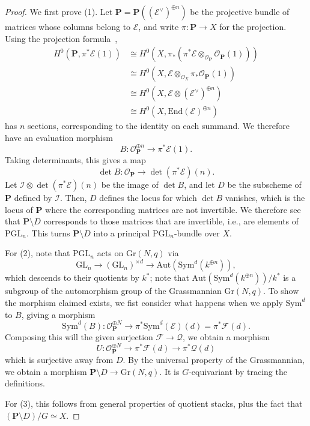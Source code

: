 \begin{proof}
We first prove (1).
Let $\mathbf{P} = \mathbf{P}((\mathcal{E}^\vee)^{\oplus n})$ be the projective
bundle of matrices whose columns belong to $\mathcal{E}$, and write
$\pi : \mathbf{P} \to X$ for the projection.
Using the projection formula~,
\begin{align*}
H^0(\mathbf{P}, \pi^*\mathcal{E}(1))
& \cong H^0(X, \pi_*(\pi^*\mathcal{E} \otimes_{\mathcal{O}_{\mathbf{P}}}
\mathcal{O}_{\mathbf{P}}(1)))\\
& \cong H^0(X,\mathcal{E} \otimes_{\mathcal{O}_X}
\pi_*\mathcal{O}_{\mathbf{P}}(1))\\
& \cong H^0(X,\mathcal{E} \otimes (\mathcal{E}^\vee)^{\oplus n})\\
& \cong H^0(X,\mathrm{End}(\mathcal{E})^{\oplus n})
\end{align*}
has $n$ sections, corresponding to the identity on each summand.
We therefore have an evaluation morphism
$$
B : \mathcal{O}_{\mathbf{P}}^{\oplus n} \longrightarrow \pi^*\mathcal{E}(1).
$$
Taking determinants, this gives a map
$$
\det B : \mathcal{O}_{\mathbf{P}} \longrightarrow \det(\pi^*\mathcal{E})(n).
$$
Let $\mathcal{I} \otimes \det(\pi^*\mathcal{E}) (n)$ be the image of $\det B$,
and let $D$ be the subscheme of $\mathbf{P}$ defined by $\mathcal{I}$.
Then, $D$ defines the locus for which $\det B$ vanishes, which is the locus of
$\mathbf{P}$ where the corresponding matrices are not invertible.
We therefore see that $\mathbf{P} \setminus D$ corresponds to those matrices
that are invertible, i.e., are elements of $\mathrm{PGL}_n$.
This turns $\mathbf{P} \setminus D$ into a principal $\mathrm{PGL}_n$-bundle
over $X$.

For (2), note that $\mathrm{PGL}_n$ acts on $\mathrm{Gr}(N,q)$ via
$$
  \mathrm{GL}_n \longrightarrow
  (\mathrm{GL}_n)^{\times d} \longrightarrow
  \mathrm{Aut}(\mathrm{Sym}^d (k^{\oplus n})),
$$
which descends to their quotients by $k^*$; note that
$\mathrm{Aut}(\mathrm{Sym}^d (k^{\oplus n}))/k^*$ is a subgroup of the
automorphism group of the Grassmannian $\mathrm{Gr}(N,q)$.
To show the morphism claimed exists, we fist consider what happens when we
apply $\mathrm{Sym}^d$ to $B$, giving a morphism
$$
  \mathrm{Sym}^d(B) : \mathcal{O}_{\mathbf{P}}^{\oplus N} \to
    \pi^*\mathrm{Sym}^d(\mathcal{E})(d) = \pi^*\mathcal{F}(d).
$$
Composing this will the given surjection $\mathcal{F} \to \mathcal{Q}$, we
obtain a morphism
$$
  U : \mathcal{O}_{\mathbf{P}}^{\oplus N} \to
        \pi^*\mathcal{F}(d) \to
        \pi^*\mathcal{Q}(d)
$$
which is surjective away from $D$.
By the universal property of the Grassmannian, we obtain a morphism
$\mathbf{P} \setminus D \to \mathrm{Gr}(N,q)$.
It is $G$-equivariant by tracing the definitions.

For (3), this follows from general properties of quotient stacks, plus the fact
that $(\mathbf{P} \setminus D)/G \simeq X$.
\end{proof}

